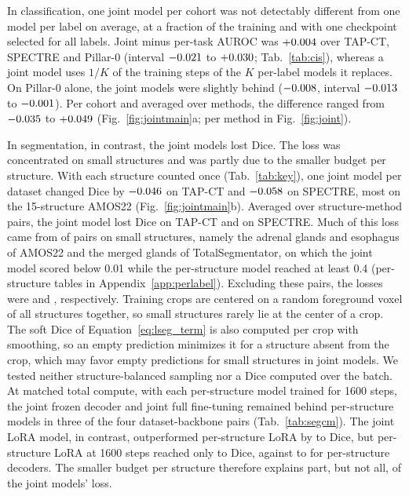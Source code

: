In classification, one joint model per cohort was not detectably different from one model per label on average, at a fraction of the training and with one checkpoint selected for all labels. Joint minus per-task AUROC was $+0.004$ over TAP-CT, SPECTRE and Pillar-0 (interval $-0.021$ to $+0.030$; Tab.~\ref{tab:cis}), whereas a joint model uses $1/K$ of the training steps of the $K$ per-label models it replaces. On Pillar-0 alone, the joint models were slightly behind ($-0.008$, interval $-0.013$ to $-0.001$). Per cohort and averaged over methods, the difference ranged from $-0.035$ to $+0.049$ (Fig.~\ref{fig:jointmain}a; per method in Fig.~\ref{fig:joint}).

\label{sec:jointseg}In segmentation, in contrast, the joint models lost Dice. The loss was concentrated on small structures and was partly due to the smaller budget per structure. With each structure counted once (Tab.~\ref{tab:key}), one joint model per dataset changed Dice by $-0.046$ on TAP-CT and $-0.058$ on SPECTRE, most on the 15-structure AMOS22 (Fig.~\ref{fig:jointmain}b). Averaged over structure-method pairs, the joint model lost \magn{\numSegjointTapctMeandiff} Dice on TAP-CT and \magn{\numSegjointSpectreMeandiff} on SPECTRE. Much of this loss came from \numSegcollapseN{} of \numSegcollapseCellsN{} pairs on small structures, namely the adrenal glands and esophagus of AMOS22 and the merged glands of TotalSegmentator, on which the joint model scored below 0.01 while the per-structure model reached at least 0.4 (per-structure tables in Appendix~\ref{app:perlabel}). Excluding these pairs, the losses were \magn{\numSegjointTapctNocollapseMeandiff} and \magn{\numSegjointSpectreNocollapseMeandiff}, respectively. Training crops are centered on a random foreground voxel of all structures together, so small structures rarely lie at the center of a crop. The soft Dice of Equation~\ref{eq:lseg_term} is also computed per crop with smoothing, so an empty prediction minimizes it for a structure absent from the crop, which may favor empty predictions for small structures in joint models. We tested neither structure-balanced sampling \citep{isensee2021nnunet} nor a Dice computed over the batch. At matched total compute, with each per-structure model trained for 1600 steps, the joint frozen decoder and joint full fine-tuning remained behind per-structure models in three of the four dataset-backbone pairs (Tab.~\ref{tab:segcm}). The joint LoRA model, in contrast, outperformed per-structure LoRA by \magn{\numCmTotalsegSpectreLoraJointdiff} to \magn{\numCmAmosBBSpectreLoraJointdiff} Dice, but per-structure LoRA at 1600 steps reached only \numCmAmosBBTapctLoraMatchedMean{} to \numCmTotalsegSpectreLoraMatchedMean{} Dice, against \numCmAmosBBSpectreDecMatchedMean{} to \numCmTotalsegSpectreDecMatchedMean{} for per-structure decoders. The smaller budget per structure therefore explains part, but not all, of the joint models' loss.
